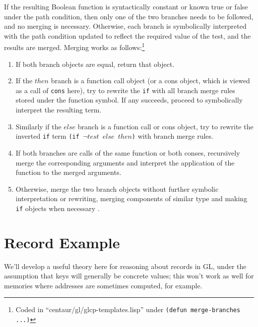 \documentclass[submission,copyright,creativecommons]{eptcs}
\newcommand*{\var}[1]{\mathit{#1}}
\begin{document}
If the resulting Boolean function is syntactically constant
or known true or false under the path condition, then only
one of the two branches needs to be followed, and no merging is
necessary.  Otherwise, each branch is symbolically interpreted with
the path condition updated to reflect the required value of the test,
and the results are merged.  Merging works as follows:\footnote{Coded
  in ``centaur/gl/glcp-templates.lisp'' under \texttt{(defun
    merge-branches ...)}}
\begin{enumerate}
\item If both branch objects are equal, return that object.
\item If the $\var{then}$ branch is a function call object (or a
  cons object, which is viewed as a call of \texttt{cons} here), try
  to rewrite the \texttt{if} with all branch merge rules stored
  under the function symbol.  If any succeeds, proceed to
  symbolically interpret the resulting term.
\item Similarly if the $\var{else}$ branch is a function call or
  cons object, try to rewrite the inverted \texttt{if} term
  \texttt{(if $\neg\var{test}$ $\var{else}$ $\var{then}$)} with branch
  merge rules.
\item If both branches are calls of the same function or both
  conses, recursively merge the corresponding arguments and
  interpret the application of the function to the merged arguments.
\item Otherwise, merge the two branch objects without further symbolic
  interpretation or rewriting, merging components of similar type and
  making \texttt{if} objects when necessary \cite{gl-diss}.
\end{enumerate}
  
\section{Record Example}
\label{sec:example}

We'll develop a useful theory here for reasoning about records in GL,
under the assumption that keys will generally be concrete values; this
won't work as well for memories where addresses are sometimes
computed, for example.
\end{document}
